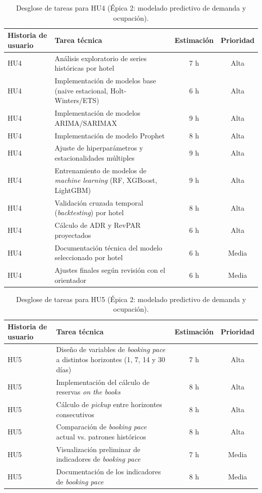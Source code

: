 \documentclass[
11pt, %
]{charter}
\begin{document}
\begin{table}[H]
\centering
\begin{tabularx}{\linewidth}{@{}|X|X|c|c|@{}}
\hline
\rowcolor[HTML]{C0C0C0}
Historia de usuario & Tarea técnica & Estimación & Prioridad \\ \hline
HU4 & Análisis exploratorio de series históricas por hotel & 7 h & Alta \\ \hline
HU4 & Implementación de modelos base (naive estacional, Holt-Winters/ETS) & 6 h & Alta \\ \hline
HU4 & Implementación de modelos ARIMA/SARIMAX & 9 h & Alta \\ \hline
HU4 & Implementación de modelo Prophet & 8 h & Alta \\ \hline
HU4 & Ajuste de hiperparámetros y estacionalidades múltiples & 9 h & Alta \\ \hline
HU4 & Entrenamiento de modelos de \textit{machine learning} (RF, XGBoost, LightGBM) & 9 h & Alta \\ \hline
HU4 & Validación cruzada temporal (\textit{backtesting}) por hotel & 8 h & Alta \\ \hline
HU4 & Cálculo de ADR y RevPAR proyectados & 6 h & Alta \\ \hline
HU4 & Documentación técnica del modelo seleccionado por hotel & 6 h & Media \\ \hline
HU4 & Ajustes finales según revisión con el orientador & 6 h & Media \\ \hline
\end{tabularx}
\caption{Desglose de tareas para HU4 (Épica 2: modelado predictivo de demanda y ocupación).}
\end{table}
 
\begin{table}[H]
\centering
\begin{tabularx}{\linewidth}{@{}|X|X|c|c|@{}}
\hline
\rowcolor[HTML]{C0C0C0}
Historia de usuario & Tarea técnica & Estimación & Prioridad \\ \hline
HU5 & Diseño de variables de \textit{booking pace} a distintos horizontes (1, 7, 14 y 30 días) & 7 h & Alta \\ \hline
HU5 & Implementación del cálculo de reservas \textit{on the books} & 8 h & Alta \\ \hline
HU5 & Cálculo de \textit{pickup} entre horizontes consecutivos & 8 h & Alta \\ \hline
HU5 & Comparación de \textit{booking pace} actual vs. patrones históricos & 8 h & Alta \\ \hline
HU5 & Visualización preliminar de indicadores de \textit{booking pace} & 7 h & Media \\ \hline
HU5 & Documentación de los indicadores de \textit{booking pace} & 8 h & Media \\ \hline
\end{tabularx}
\caption{Desglose de tareas para HU5 (Épica 2: modelado predictivo de demanda y ocupación).}
\end{table}
 
\end{document}
